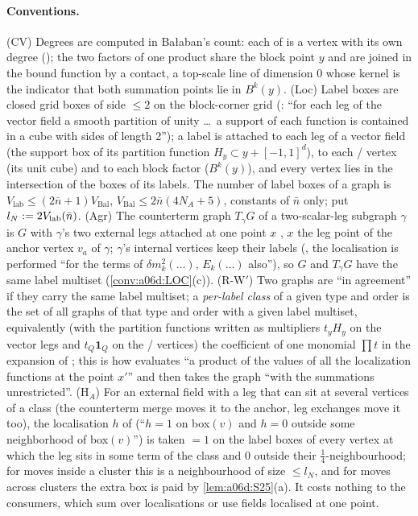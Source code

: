 \paragraph{Conventions.} (CV) Degrees are computed in Ba{\l}aban's count: each of \cite[(1.13), (1.14), (1.15)]{Ba3} is a vertex with its own degree (\cite[p.~423 (v), p.~414]{Ba3}); the two factors of one product \cite[(1.18)]{Ba3} share the block point $y$ and are joined in the bound function by a contact, a top-scale line of dimension $0$ whose kernel is the indicator that both summation points lie in $B^k(y)$. (Loc) Label boxes are closed grid boxes of side $\le2$ on the block-corner grid (\cite[p.~420]{Ba3}: ``for each leg of the vector field a smooth partition of unity \dots\ a support of each function is contained in a cube with sides of length 2''); a label is attached to each leg of a vector field (the support box of its partition function $H_y\subset y+[-1,1]^d$), to each \cite[(1.6)]{Ba3}/\cite[(1.7)]{Ba3} vertex (its unit cube) and to each block factor ($B^k(y)$), and every vertex lies in the intersection of the boxes of its labels. The number of label boxes of a graph is $V_{\mathrm{lab}}\le(2\bar n+1)V_{\mathrm{Bal}}$, $V_{\mathrm{Bal}}\le2\bar n(4N_A+5)$, constants of $\bar n$ only; put $l_N:=2V_{\mathrm{lab}}(\bar n)$. (Agr) The counterterm graph $T_\gamma G$ of a two-scalar-leg subgraph $\gamma$ is $G$ with $\gamma$'s two external legs attached at one point $x$ \cite[p.~417]{Ba3}, $x$ the leg point of the anchor vertex $v_a$ of $\gamma$; $\gamma$'s internal vertices keep their labels (\cite[p.~420]{Ba3}, the localisation is performed ``for the terms of $\delta m^2_k(\dots)$, $E_k(\dots)$ also''), so $G$ and $T_\gamma G$ have the same label multiset (\cref{conv:a06d:LOC}(c)). (R-W$'$) Two graphs are ``in agreement'' \cite[p.~432]{Ba3} if they carry the same label multiset; a \emph{per-label class} of a given type and order is the set of all graphs of that type and order with a given label multiset, equivalently (with the partition functions written as multipliers $t_yH_y$ on the vector legs and $t_Q\mathbf 1_Q$ on the \cite[(1.6)]{Ba3}/\cite[(1.7)]{Ba3} vertices) the coefficient of one monomial $\prod t$ in the expansion of \cite[(1.5)]{Ba3}; this is how \cite[p.~444]{Ba3} evaluates ``a product of the values of all the localization functions at the point $x'$'' and then takes the graph ``with the summations unrestricted''. (H$_A$) For an external field with a leg that can sit at several vertices of a class (the counterterm merge moves it to the anchor, leg exchanges move it too), the localisation $h$ of \cite[p.~420]{Ba3} (``$h=1$ on box$(v)$ and $h=0$ outside some neighborhood of box$(v)$'') is taken $=1$ on the label boxes of every vertex at which the leg sits in some term of the class and $0$ outside their $\frac14$-neighbourhood; for moves inside a cluster this is a neighbourhood of size $\le l_N$, and for moves across clusters the extra box is paid by \cref{lem:a06d:S25}(a). It costs nothing to the consumers, which sum over localisations \cite[p.~421]{Ba3} or use fields localised at one point.

